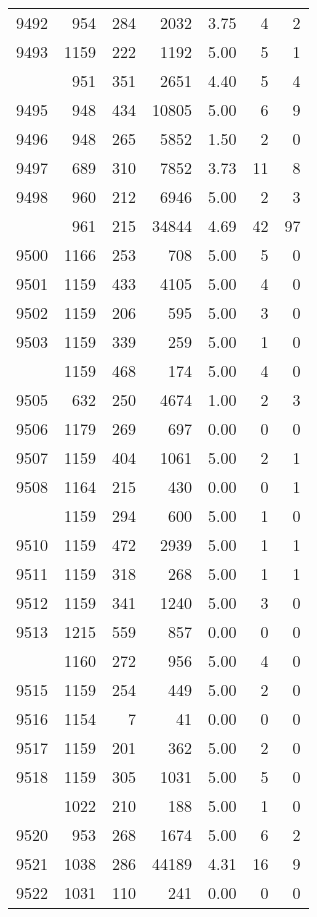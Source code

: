 \documentclass[
]{article}
\begin{document}
\begin{table}
\begin{tabular}[t]{lrrrrrr}
9492 & 954 & 284 & 2032 & 3.75 & 4 & 2\\
9493 & 1159 & 222 & 1192 & 5.00 & 5 & 1\\
\addlinespace
9494 & 951 & 351 & 2651 & 4.40 & 5 & 4\\
9495 & 948 & 434 & 10805 & 5.00 & 6 & 9\\
9496 & 948 & 265 & 5852 & 1.50 & 2 & 0\\
9497 & 689 & 310 & 7852 & 3.73 & 11 & 8\\
9498 & 960 & 212 & 6946 & 5.00 & 2 & 3\\
\addlinespace
9499 & 961 & 215 & 34844 & 4.69 & 42 & 97\\
9500 & 1166 & 253 & 708 & 5.00 & 5 & 0\\
9501 & 1159 & 433 & 4105 & 5.00 & 4 & 0\\
9502 & 1159 & 206 & 595 & 5.00 & 3 & 0\\
9503 & 1159 & 339 & 259 & 5.00 & 1 & 0\\
\addlinespace
9504 & 1159 & 468 & 174 & 5.00 & 4 & 0\\
9505 & 632 & 250 & 4674 & 1.00 & 2 & 3\\
9506 & 1179 & 269 & 697 & 0.00 & 0 & 0\\
9507 & 1159 & 404 & 1061 & 5.00 & 2 & 1\\
9508 & 1164 & 215 & 430 & 0.00 & 0 & 1\\
\addlinespace
9509 & 1159 & 294 & 600 & 5.00 & 1 & 0\\
9510 & 1159 & 472 & 2939 & 5.00 & 1 & 1\\
9511 & 1159 & 318 & 268 & 5.00 & 1 & 1\\
9512 & 1159 & 341 & 1240 & 5.00 & 3 & 0\\
9513 & 1215 & 559 & 857 & 0.00 & 0 & 0\\
\addlinespace
9514 & 1160 & 272 & 956 & 5.00 & 4 & 0\\
9515 & 1159 & 254 & 449 & 5.00 & 2 & 0\\
9516 & 1154 & 7 & 41 & 0.00 & 0 & 0\\
9517 & 1159 & 201 & 362 & 5.00 & 2 & 0\\
9518 & 1159 & 305 & 1031 & 5.00 & 5 & 0\\
\addlinespace
9519 & 1022 & 210 & 188 & 5.00 & 1 & 0\\
9520 & 953 & 268 & 1674 & 5.00 & 6 & 2\\
9521 & 1038 & 286 & 44189 & 4.31 & 16 & 9\\
9522 & 1031 & 110 & 241 & 0.00 & 0 & 0\\

\end{tabular}
\end{table}
\end{document}
